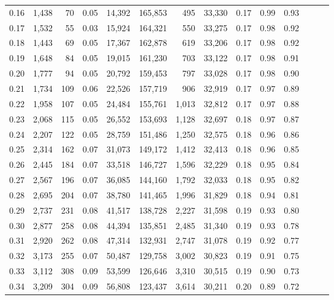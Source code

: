 \begin{tabular}{rrrrrrrrrrrrrr}
0.16 &  1,438 &   70 &  0.05 &   14,392 &  165,853 &     495 &  33,330 &  0.17 &  0.99 &      0.93 \\
0.17 &  1,532 &   55 &  0.03 &   15,924 &  164,321 &     550 &  33,275 &  0.17 &  0.98 &      0.92 \\
0.18 &  1,443 &   69 &  0.05 &   17,367 &  162,878 &     619 &  33,206 &  0.17 &  0.98 &      0.92 \\
0.19 &  1,648 &   84 &  0.05 &   19,015 &  161,230 &     703 &  33,122 &  0.17 &  0.98 &      0.91 \\
0.20 &  1,777 &   94 &  0.05 &   20,792 &  159,453 &     797 &  33,028 &  0.17 &  0.98 &      0.90 \\
0.21 &  1,734 &  109 &  0.06 &   22,526 &  157,719 &     906 &  32,919 &  0.17 &  0.97 &      0.89 \\
0.22 &  1,958 &  107 &  0.05 &   24,484 &  155,761 &   1,013 &  32,812 &  0.17 &  0.97 &      0.88 \\
0.23 &  2,068 &  115 &  0.05 &   26,552 &  153,693 &   1,128 &  32,697 &  0.18 &  0.97 &      0.87 \\
0.24 &  2,207 &  122 &  0.05 &   28,759 &  151,486 &   1,250 &  32,575 &  0.18 &  0.96 &      0.86 \\
0.25 &  2,314 &  162 &  0.07 &   31,073 &  149,172 &   1,412 &  32,413 &  0.18 &  0.96 &      0.85 \\
0.26 &  2,445 &  184 &  0.07 &   33,518 &  146,727 &   1,596 &  32,229 &  0.18 &  0.95 &      0.84 \\
0.27 &  2,567 &  196 &  0.07 &   36,085 &  144,160 &   1,792 &  32,033 &  0.18 &  0.95 &      0.82 \\
0.28 &  2,695 &  204 &  0.07 &   38,780 &  141,465 &   1,996 &  31,829 &  0.18 &  0.94 &      0.81 \\
0.29 &  2,737 &  231 &  0.08 &   41,517 &  138,728 &   2,227 &  31,598 &  0.19 &  0.93 &      0.80 \\
0.30 &  2,877 &  258 &  0.08 &   44,394 &  135,851 &   2,485 &  31,340 &  0.19 &  0.93 &      0.78 \\
0.31 &  2,920 &  262 &  0.08 &   47,314 &  132,931 &   2,747 &  31,078 &  0.19 &  0.92 &      0.77 \\
0.32 &  3,173 &  255 &  0.07 &   50,487 &  129,758 &   3,002 &  30,823 &  0.19 &  0.91 &      0.75 \\
0.33 &  3,112 &  308 &  0.09 &   53,599 &  126,646 &   3,310 &  30,515 &  0.19 &  0.90 &      0.73 \\
0.34 &  3,209 &  304 &  0.09 &   56,808 &  123,437 &   3,614 &  30,211 &  0.20 &  0.89 &      0.72 \\

\end{tabular}
